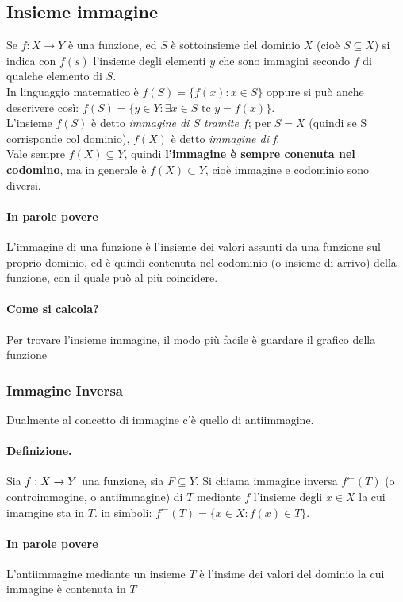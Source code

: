 \documentclass[12pt, a4paper, openany]{book}
\begin{document}
\subsection*{Insieme immagine}
Se $f: X \rightarrow Y$ è una funzione, ed $S$ è sottoinsieme del dominio $X$ (cioè $S \subseteq X$) si indica con $f(s)$ l'insieme degli elementi $y$ che sono immagini secondo $f$ di qualche elemento di $S$.
\\In linguaggio matematico è $f(S) = \{ f(x) : x \in S\}$ oppure si può anche descrivere così: $f(S) = \{y \in Y : \exists x \in S \text{ tc } y = f(x)\}$.
\\L'insieme $f(S)$ è detto \emph{immagine di $S$ tramite $f$}; per $S = X$ (quindi se S corrisponde col dominio), $f(X)$ è detto \emph{immagine di f}.
\\Vale sempre $f(X) \subseteq Y$, quindi \textbf{l'immagine è sempre conenuta nel codomino}, ma in generale è $f(X) \subset Y$, cioè immagine e codominio sono diversi.

\paragraph{In parole povere}
L'immagine di una funzione è l'insieme dei valori assunti da una funzione sul proprio dominio,
ed è quindi contenuta nel codominio (o insieme di arrivo) della funzione, con il quale può al più coincidere.
\paragraph{Come si calcola?}
Per trovare l'insieme immagine, il modo più facile è guardare il grafico della funzione

\subsubsection{Immagine Inversa}
Dualmente al concetto di immagine c'è quello di antiimmagine.
\paragraph{Definizione. }Sia $f: X \rightarrow Y $ una funzione, sia $F \subseteq Y$.
Si chiama immagine inversa $f^\leftarrow(T)$ (o controimmagine, o antiimmagine) di $T$ mediante $f$ l'insieme degli $x \in X$ la cui imamgine sta in $T$.
in simboli: $f^\leftarrow(T) = \{ x \in X : f(x) \in T\}$.
\paragraph{In parole povere} L'antiimmagine mediante un insieme $T$ è l'insime dei valori del dominio la cui immagine è contenuta in $T$
\end{document}
